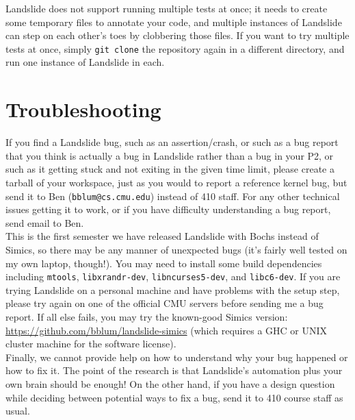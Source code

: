 \documentclass{article}
\begin{document}
 Landslide does not support running multiple tests at once;
it needs to create some temporary files to annotate your code, and multiple instances of Landslide can step on each other's toes by clobbering those files.
If you want to try multiple tests at once, simply {\tt git clone} the repository again in a different directory, and run one instance of Landslide in each.
\\

\section{Troubleshooting}

If you find a Landslide bug, such as an assertion/crash, or such as a
bug report that you think is actually a bug in Landslide rather than a bug in your P2, or such as it getting stuck
and not exiting in the given time limit, please create a tarball of your workspace, just as you would to report
a reference kernel bug, but send it to Ben ({\tt bblum@cs.cmu.edu}) instead of 410 staff. For any other technical
issues getting it to work, or if you have difficulty understanding a bug report, send email to Ben.
\\

\noindent
This is the first semester we have released Landslide with Bochs instead of Simics,
so there may be any manner of unexpected bugs (it's fairly well tested on my own laptop, though!).
You may need to install some build dependencies including
{\tt mtools}, {\tt libxrandr-dev}, {\tt libncurses5-dev}, and {\tt libc6-dev}.
If you are trying Landslide on a personal machine and have problems with the setup step,
please try again on one of the official CMU servers before sending me a bug report.
If all else fails, you may try the known-good Simics version:
\url{https://github.com/bblum/landslide-simics}
(which requires a GHC or UNIX cluster machine for the software license).
\\

\noindent Finally, we cannot provide help on how to understand why your bug happened or how to fix it. The point of
the research is that Landslide's automation plus your own brain should be enough! On the other hand, if you have
a design question while deciding between potential ways to fix a bug, send it to 410 course staff as usual.
\end{document}
